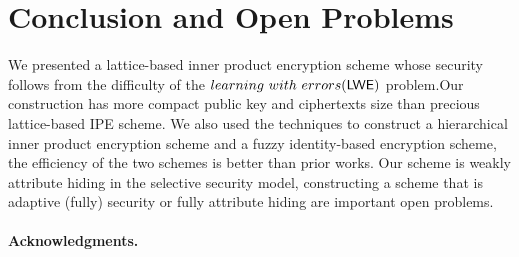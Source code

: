 \section{Conclusion and Open Problems}
We presented a lattice-based inner product encryption scheme whose security follows from the difficulty of the $learning~with~errors (\mathsf{LWE})$ problem.Our construction has  more compact public key and ciphertexts size than precious lattice-based IPE scheme. We also used the techniques to construct a hierarchical inner product encryption scheme and a fuzzy identity-based encryption scheme, the efficiency of the two schemes is better than prior works. Our scheme is weakly attribute hiding in the selective security model, constructing a scheme that is adaptive (fully) security or fully attribute hiding are important open problems.\\
\\
\textbf{Acknowledgments.} 